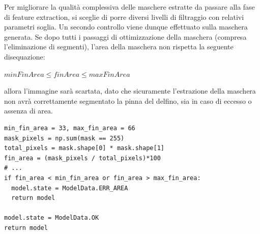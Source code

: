 \documentclass[a4paper,12pt]{report}
\begin{document}
    Per migliorare la qualità complessiva delle maschere estratte da passare alla fase di feature extraction,
    si sceglie di porre diversi livelli di filtraggio con relativi parametri soglia.
    Un secondo controllo viene dunque effettuato sulla maschera generata. Se 
    dopo tutti i passaggi di ottimizzazione della maschera (compresa l'eliminazione di
    segmenti), l'area della maschera non rispetta la seguente disequazione:
    \begin{minipage}{1\textwidth}
      \centering
      $minFinArea \leq finArea \leq maxFinArea$
    \end{minipage}
    
    allora l'immagine sarà scartata, dato che sicuramente l'estrazione della maschera
    non avrà correttamente segmentato la pinna del delfino, sia in caso di eccesso o assenza di area.
    
    \begin{lstlisting}
min_fin_area = 33, max_fin_area = 66
mask_pixels = np.sum(mask == 255)
total_pixels = mask.shape[0] * mask.shape[1]
fin_area = (mask_pixels / total_pixels)*100
# ...
if fin_area < min_fin_area or fin_area > max_fin_area:
  model.state = ModelData.ERR_AREA
  return model

model.state = ModelData.OK
return model
    \end{lstlisting}
    \newpage
   
\end{document}
